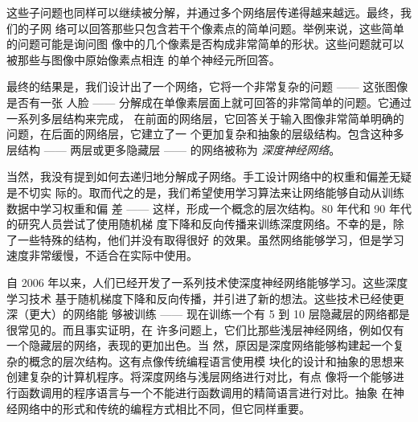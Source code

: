\begin{center}
\end{center}

这些子问题也同样可以继续被分解，并通过多个网络层传递得越来越远。最终，我们的子网
络可以回答那些只包含若干个像素点的简单问题。举例来说，这些简单的问题可能是询问图
像中的几个像素是否构成非常简单的形状。这些问题就可以被那些与图像中原始像素点相连
的单个神经元所回答。

最终的结果是，我们设计出了一个网络，它将一个非常复杂的问题 —— 这张图像是否有一张
人脸 —— 分解成在单像素层面上就可回答的非常简单的问题。它通过一系列多层结构来完成，
在前面的网络层，它回答关于输入图像非常简单明确的问题，在后面的网络层，它建立了一
个更加复杂和抽象的层级结构。包含这种多层结构 —— 两层或更多隐藏层 —— 的网络被称为%
\emph{深度神经网络}。

当然，我没有提到如何去递归地分解成子网络。手工设计网络中的权重和偏差无疑是不切实
际的。取而代之的是，我们希望使用学习算法来让网络能够自动从训练数据中学习权重和偏
差 —— 这样，形成一个概念的层次结构。80 年代和 90 年代的研究人员尝试了使用随机梯
度下降和反向传播来训练深度网络。不幸的是，除了一些特殊的结构，他们并没有取得很好
的效果。虽然网络能够学习，但是学习速度非常缓慢，不适合在实际中使用。

自 2006 年以来，人们已经开发了一系列技术使深度神经网络能够学习。这些深度学习技术
基于随机梯度下降和反向传播，并引进了新的想法。这些技术已经使更深（更大）的网络能
够被训练 —— 现在训练一个有 5 到 10 层隐藏层的网络都是很常见的。而且事实证明，在
许多问题上，它们比那些浅层神经网络，例如仅有一个隐藏层的网络，表现的更加出色。当
然，原因是深度网络能够构建起一个复杂的概念的层次结构。这有点像传统编程语言使用模
块化的设计和抽象的思想来创建复杂的计算机程序。将深度网络与浅层网络进行对比，有点
像将一个能够进行函数调用的程序语言与一个不能进行函数调用的精简语言进行对比。抽象
在神经网络中的形式和传统的编程方式相比不同，但它同样重要。
